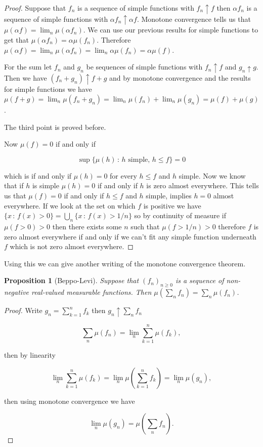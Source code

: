 \documentclass[
]{book}
\newtheorem{proposition}{Proposition}[chapter]
\theoremstyle{definition}
\theoremstyle{definition}
\theoremstyle{definition}
\theoremstyle{definition}
\theoremstyle{remark}
\begin{document}
\begin{proof}
Suppose that \(f_n\) is a sequence of simple functions with \(f_n \uparrow f\) then \(\alpha f_n\) is a sequence of simple functions with \(\alpha f_n \uparrow \alpha f\). Monotone convergence tells us that \(\mu(\alpha f) = \lim_n \mu(\alpha f_n)\). We can use our previous results for simple functions to get that \(\mu(\alpha f_n) = \alpha \mu(f_n)\). Therefore \(\mu(\alpha f) = \lim_n \mu(\alpha f_n) = \lim_n \alpha \mu(f_n) = \alpha \mu(f)\).

For the sum let \(f_n\) and \(g_n\) be sequences of simple functions with \(f_n \uparrow f\) and \(g_n \uparrow g\). Then we have \((f_n + g_n) \uparrow f+g\) and by monotone convergence and the results for simple functions we have \(\mu(f+g) = \lim_n \mu(f_n + g_n) = \lim_n \mu(f_n) + \lim_n \mu(g_n) = \mu(f) + \mu(g)\).

The third point is proved before.

Now \(\mu(f) = 0\) if and only if

\[\sup\{ \mu(h) \,:\, \mbox{$h$ simple},\, h \leq f\} = 0\]

which is if and only if \(\mu(h) = 0\) for every \(h \leq f\) and \(h\) simple. Now we know that if \(h\) is simple \(\mu(h) = 0\) if and only if \(h\) is zero almost everywhere. This tells us that \(\mu(f) = 0\) if and only if \(h \leq f\) and \(h\) simple, implies \(h = 0\) almost everywhere. If we look at the set on which \(f\) is positive we have \(\{x\,:\, f(x)>0\} = \bigcup_n \{ x \,:\, f(x) > 1/n\}\) so by continuity of measure if \(\mu( f>0)>0\) then there exists some \(n\) such that \(\mu(f >1/n)>0\) therefore \(f\) is zero almost everywhere if and only if we can't fit any simple function underneath \(f\) which is not zero almost everywhere.
\end{proof}

Using this we can give another writing of the monotone convergence theorem.

\begin{proposition}[Beppo-Levi]
Suppose that \((f_n)_{n \geq 0}\) is a sequence of non-negative real-valued measurable functions. Then \(\mu(\sum_n f_n) = \sum_n \mu(f_n)\).
\end{proposition}

\begin{proof}
Write \(g_n = \sum_{k=1}^n f_k\) then \(g_n \uparrow \sum_n f_n\)

\[  \sum_n \mu(f_n) = \lim_n \sum_{k=1}^n \mu(f_k),\]

then by linearity

\[ \lim_n \sum_{k=1}^n \mu(f_k) = \lim_n \mu(\sum_{k=1}^n f_k) = \lim_n \mu(g_n), \]

then using monotone convergence we have

\[ \lim_n \mu(g_n) = \mu(\sum_n f_n). \]
\end{proof}
\end{document}
